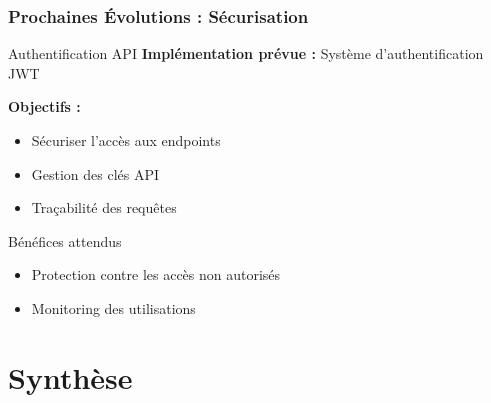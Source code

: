 \documentclass[
	11pt,
	aspectratio=169,
]{beamer}
\begin{document}
\begin{frame}
	\frametitle{Prochaines Évolutions : Sécurisation}
	
	\begin{block}{Authentification API}
		\textbf{Implémentation prévue :} Système d'authentification JWT
		
		\bigskip
		
		\textbf{Objectifs :}
		\begin{itemize}
			\item Sécuriser l'accès aux endpoints
			\item Gestion des clés API
			\item Traçabilité des requêtes
		\end{itemize}
	\end{block}
	
	\smallskip
	
	\begin{exampleblock}{Bénéfices attendus}
		\begin{itemize}
			\item Protection contre les accès non autorisés
			\item Monitoring des utilisations
		\end{itemize}
	\end{exampleblock}
\end{frame}


\section{Synthèse}
\end{document}
